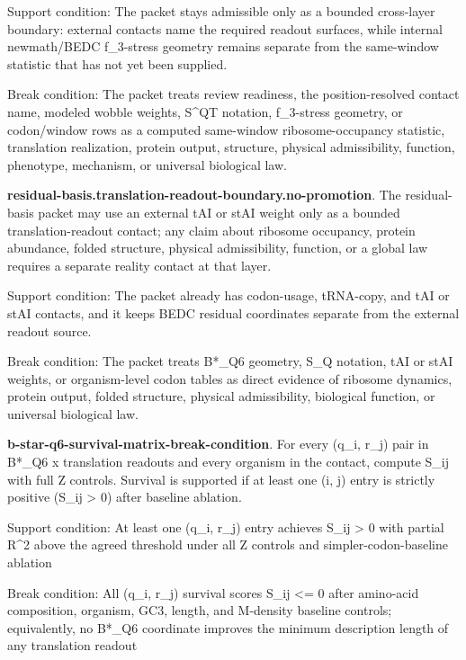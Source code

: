 Support condition: The packet stays admissible only as a bounded cross-layer boundary: external contacts name the required readout surfaces, while internal newmath/BEDC f\_3-stress geometry remains separate from the same-window statistic that has not yet been supplied.

Break condition: The packet treats review readiness, the position-resolved contact name, modeled wobble weights, S\textasciicircum{}QT notation, f\_3-stress geometry, or codon/window rows as a computed same-window ribosome-occupancy statistic, translation realization, protein output, structure, physical admissibility, function, phenotype, mechanism, or universal biological law.

\textbf{residual-basis.translation-readout-boundary.no-promotion}. The residual-basis packet may use an external tAI or stAI weight only as a bounded translation-readout contact; any claim about ribosome occupancy, protein abundance, folded structure, physical admissibility, function, or a global law requires a separate reality contact at that layer.

Support condition: The packet already has codon-usage, tRNA-copy, and tAI or stAI contacts, and it keeps BEDC residual coordinates separate from the external readout source.

Break condition: The packet treats B*\_Q6 geometry, S\_Q notation, tAI or stAI weights, or organism-level codon tables as direct evidence of ribosome dynamics, protein output, folded structure, physical admissibility, biological function, or universal biological law.

\textbf{b-star-q6-survival-matrix-break-condition}. For every (q\_i, r\_j) pair in B*\_Q6 x translation readouts and every organism in the contact, compute S\_ij with full Z controls. Survival is supported if at least one (i, j) entry is strictly positive (S\_ij > 0) after baseline ablation.

Support condition: At least one (q\_i, r\_j) entry achieves S\_ij > 0 with partial R\textasciicircum{}2 above the agreed threshold under all Z controls and simpler-codon-baseline ablation

Break condition: All (q\_i, r\_j) survival scores S\_ij <= 0 after amino-acid composition, organism, GC3, length, and M-density baseline controls; equivalently, no B*\_Q6 coordinate improves the minimum description length of any translation readout

